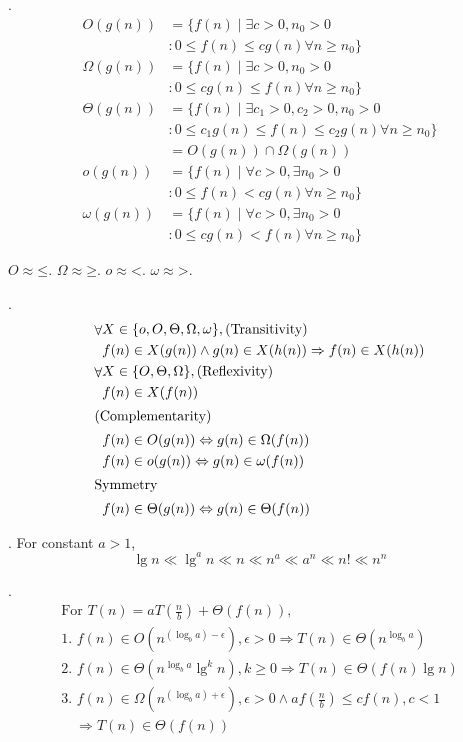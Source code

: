 \documentclass[fleqn]{slnotes}
\DeclareMathOperator{\Exists}{\exists}
\DeclareMathOperator{\Forall}{\forall}
\begin{document}
. \begin{align*}
O(g(n)) &= \{ f(n) \mid \Exists c > 0, n_0 > 0 \\
        &: 0 \le f(n) \le c g(n) \Forall n \ge n_0 \}\\
\Omega(g(n)) &= \{ f(n) \mid \Exists c > 0, n_0 > 0 \\
             &: 0 \le c g(n) \le f(n) \Forall n \ge n_0 \}\\
\Theta(g(n)) &= \{ f(n) \mid \Exists c_1 > 0, c_2 > 0, n_0 > 0 \\
             &: 0 \le c_1 g(n) \le f(n) \le c_2 g(n) \Forall n \ge n_0 \}\\
             &= O(g(n)) \cap \Omega(g(n))\\
o(g(n)) &= \{ f(n) \mid \Forall c > 0, \Exists n_0 > 0 \\
        &: 0 \le f(n) < c g(n) \Forall n \ge n_0 \}\\
\omega(g(n)) &= \{ f(n) \mid \Forall c > 0, \Exists n_0 > 0 \\
        &: 0 \le c g(n) < f(n) \Forall n \ge n_0 \}
\end{align*}

\(O \approx \mathord{\le}\). \(\Omega \approx \mathord{\ge}\). \(o \approx \mathord{<}\). \(\omega \approx \mathord{>}\).

. \begin{align*}
\Forall &X \in \{o,O,\Theta,\Omega,\omega\}, \text{(Transitivity)}\\
  &f(n) \in X(g(n)) \land g(n) \in X(h(n)) \Rightarrow f(n) \in X(h(n))\\
\Forall &X \in \{O,\Theta,\Omega\}, \text{(Reflexivity)}\\
  &f(n) \in X(f(n))\\
\intertext{(Complementarity)}
&f(n) \in O(g(n)) \Leftrightarrow g(n) \in \Omega(f(n))\\
&f(n) \in o(g(n)) \Leftrightarrow g(n) \in \omega(f(n))\\
\intertext{Symmetry}
&f(n) \in \Theta(g(n)) \Leftrightarrow g(n) \in \Theta(f(n))
\end{align*}

. For constant \(a > 1\), \[
\lg n \ll \lg^a n \ll n \ll n^a \ll a^n \ll n! \ll n^n
\]

.
\begin{gather*}
\text{For } T(n) = aT\left(\frac{n}{b}\right) + \Theta(f(n)),\\
\text{1. } f(n) \in O(n^{(\log_b a)-\epsilon}), \epsilon > 0 \Rightarrow T(n) \in \Theta(n^{\log_b a})\\
\text{2. } f(n) \in \Theta(n^{\log_b a} \lg^k n), k \ge 0 \Rightarrow T(n) \in \Theta(f(n) \lg n)\\
\text{3. } f(n) \in \Omega(n^{(\log_b a) + \epsilon}), \epsilon > 0 \land a f\left(\frac{n}{b}\right) \le c f(n), c < 1\\
\quad \Rightarrow T(n) \in \Theta(f(n))
\end{gather*}
\end{document}
